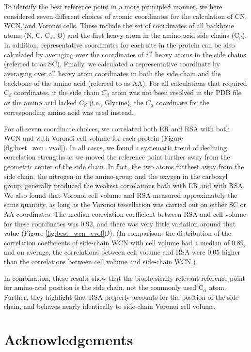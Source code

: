 \documentclass[12pt]{article}
\begin{document}
    To identify the best reference point in a more principled manner, we here considered seven different choices of atomic coordinates for the calculation of CN, WCN, and Voronoi cells. These include the set of coordinates of all backbone atoms (N, C, C$_\alpha$, O) and the first heavy atom in the amino acid side chains (C$_\beta$). In addition, representative coordinates for each site in the protein can be also calculated by averaging over the coordinates of all heavy atoms in the side chains (referred to as SC). Finally, we calculated a representative coordinate by averaging over all heavy atom coordinates in both the side chain and the backbone of the amino acid (referred to as AA). For all calculations that required C$_\beta$ coordinates, if the side chain $C_\beta$ atom was not been resolved in the PDB file or the amino acid lacked $C_\beta$ (i.e., Glycine), the $C_\alpha$ coordinate for the corresponding amino acid was used instead.
    
    For all seven coordinate choices, we correlated both ER and RSA with both WCN and with Voronoi cell volume for each protein (Figure \ref{fig:best_wcn_vvol}). In all cases, we found a systematic trend of declining correlation strengths as we moved the reference point further away from the geometric center of the side chain. In fact, the two atoms furthest away from the side chain, the nitrogen in the amino-group and the oxygen in the carboxyl group, generally produced the weakest correlations both with ER and with RSA. We also found that Voronoi cell volume and RSA measured approximately the same quantity, as long as the Voronoi tessellation was carried out on either SC or AA coordinates. The median correlation coefficient between RSA and cell volume for these coordinates was 0.92, and there was very little variation around that value (Figure \ref{fig:best_wcn_vvol}D). (In comparison, the distribution of the correlation coefficients of side-chain WCN with cell volume had a median of 0.89, and on average, the correlations between cell volume and RSA were 0.05 higher than the correlations between cell volume and side-chain WCN.)
    
    In combination, these results show that the biophysically relevant reference point for amino-acid position is the side chain, not the commonly used C$_\alpha$ atom. Further, they highlight that RSA properly accounts for the position of the side chain, and behaves nearly identically to side-chain Voronoi cell volume.
    

\section*{Acknowledgements}
\end{document}
